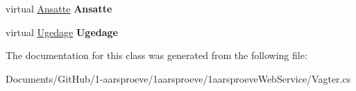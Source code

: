 \begin{DoxyCompactItemize}
\item 
\hypertarget{class__1aarsproeve_web_service_1_1_vagter_ad71bc31863d18ca74a6f16f55b200a19}{}virtual \hyperlink{class__1aarsproeve_web_service_1_1_ansatte}{Ansatte} {\bfseries Ansatte}\label{class__1aarsproeve_web_service_1_1_vagter_ad71bc31863d18ca74a6f16f55b200a19}

\item 
\hypertarget{class__1aarsproeve_web_service_1_1_vagter_a97cf9deaef289987e36dfc6f51332048}{}virtual \hyperlink{class__1aarsproeve_web_service_1_1_ugedage}{Ugedage} {\bfseries Ugedage}\label{class__1aarsproeve_web_service_1_1_vagter_a97cf9deaef289987e36dfc6f51332048}

\end{DoxyCompactItemize}


The documentation for this class was generated from the following file\+:\begin{DoxyCompactItemize}
\item 
Documents/\+Git\+Hub/1-\/aarsproeve/1aarsproeve/1aarsproeve\+Web\+Service/Vagter.\+cs\end{DoxyCompactItemize}
